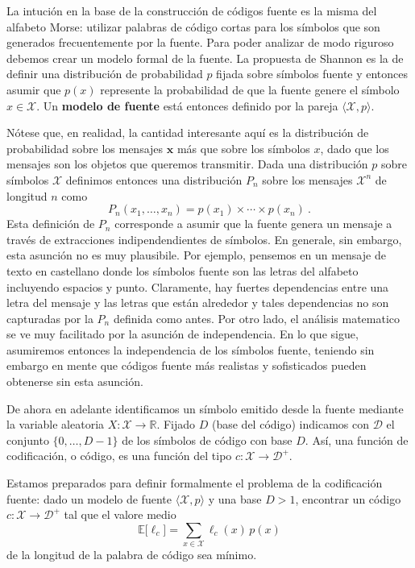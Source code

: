 \documentclass[11pt]{article}
\newcommand{\bx}{ \boldsymbol{x} }
\newcommand{\scD}{\mathcal{D}}
\newcommand{\scX}{\mathcal{X}}
\newcommand{\field}[1]{\mathbb{#1}}
\newcommand{\R}{\field{R}}
\newcommand{\E}{\field{E}}
\begin{document}
La intución en la base de la construcción de códigos fuente es la misma del alfabeto Morse: utilizar palabras de código cortas para los símbolos que son generados frecuentemente por la fuente. Para poder analizar de modo riguroso debemos crear un modelo formal de la fuente. La propuesta de Shannon es la de definir una distribución de probabilidad $p$ fijada sobre símbolos fuente y entonces asumir que $p(x)$ represente la probabilidad de que la fuente genere el símbolo $x\in\scX$. Un \textbf{modelo de fuente} está entonces definido por la pareja $\langle\scX,p\rangle$.

Nótese que, en realidad, la cantidad interesante aquí es la distribución de probabilidad sobre los mensajes $\bx$ más que sobre los símbolos $x$, dado que los mensajes son los objetos que queremos transmitir. Dada una distribución $p$ sobre símbolos $\scX$ definimos entonces una distribución $P_n$ sobre los mensajes $\scX^n$ de longitud $n$ como
\[
    P_n(x_1,\dots,x_n) = p(x_1) \times\cdots\times p(x_n)~.
\]
Esta definición de $P_n$ corresponde a asumir que la fuente genera un mensaje a través de extracciones indipendendientes de símbolos. En generale, sin embargo, esta asunción no es muy plausibile. Por ejemplo, pensemos en un mensaje de texto en castellano donde los símbolos fuente son las letras del alfabeto incluyendo espacios y punto. Claramente, hay fuertes dependencias entre una letra del mensaje y las letras que están alrededor y tales dependencias no son capturadas por la $P_n$ definida como antes. Por otro lado, el análisis matematico se ve muy facilitado por la asunción de independencia. En lo que sigue, asumiremos entonces la independencia de los símbolos fuente, teniendo sin embargo en mente que códigos fuente más realistas y sofisticados pueden obtenerse sin esta asunción.

De ahora en adelante identificamos un símbolo emitido desde la fuente mediante la variable aleatoria $X : \scX\to\R$.
Fijado $D$ (base del código) indicamos con $\scD$ el conjunto $\{0,\dots,D-1\}$ de los símbolos de código con base $D$. Así, una función de codificación, o código, es una función del tipo $c : \scX\to\scD^+$.

Estamos preparados para definir formalmente el problema de la codificación fuente: dado un modelo de fuente $\langle\scX,p\rangle$ y una base $D > 1$, encontrar un código $c : \scX\to\scD^+$ tal que el valore medio
\begin{equation}
\label{eq:source-coding}
    \E\bigl[\ell_c\bigr] = \sum_{x\in\scX} \ell_c(x)\,p(x)
\end{equation}
de la longitud de la palabra de código sea mínimo.
\end{document}
